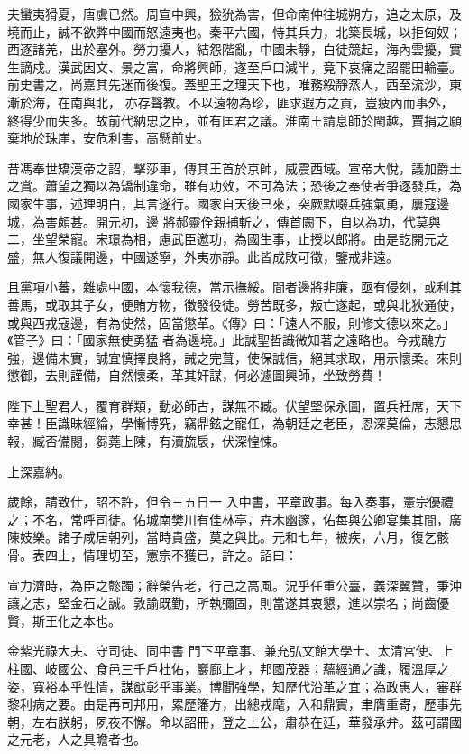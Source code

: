 \begin{pinyinscope}
 夫蠻夷猾夏，唐虞已然。周宣中興，獫狁為害，但命南仲往城朔方，追之太原，及境而止，誠不欲弊中國而怒遠夷也。秦平六國，恃其兵力，北築長城，以拒匈奴；西逐諸羌，出於塞外。勞力擾人，結怨階亂，中國未靜，白徒競起，海內雲擾，實生謫戍。漢武因文、景之富，命將興師，遂至戶口減半，竟下哀痛之詔罷田輪臺。前史書之，尚嘉其先迷而後復。蓋聖王之理天下也，唯務綏靜蒸人，西至流沙，東漸於海，在南與北，
 亦存聲教。不以遠物為珍，匪求遐方之貢，豈疲內而事外，終得少而失多。故前代納忠之臣，並有匡君之議。淮南王請息師於閩越，賈捐之願棄地於珠崖，安危利害，高懸前史。



 昔馮奉世矯漢帝之詔，擊莎車，傳其王首於京師，威震西域。宣帝大悅，議加爵土之賞。蕭望之獨以為矯制違命，雖有功效，不可為法；恐後之奉使者爭逐發兵，為國家生事，述理明白，其言遂行。國家自天後已來，突厥默啜兵強氣勇，屢寇邊城，為害頗甚。開元初，邊
 將郝靈佺親捕斬之，傳首闕下，自以為功，代莫與二，坐望榮寵。宋璟為相，慮武臣邀功，為國生事，止授以郎將。由是訖開元之盛，無人復議開邊，中國遂寧，外夷亦靜。此皆成敗可徵，鑒戒非遠。



 且黨項小蕃，雜處中國，本懷我德，當示撫綏。間者邊將非廉，亟有侵刻，或利其善馬，或取其子女，便賄方物，徵發役徒。勞苦既多，叛亡遂起，或與北狄通使，或與西戎寇邊，有為使然，固當懲革。《傳》曰：「遠人不服，則修文德以來之。」《管子》曰：「國家無使勇猛
 者為邊境。」此誠聖哲識微知著之遠略也。今戎醜方強，邊備未實，誠宜慎擇良將，誡之完葺，使保誠信，絕其求取，用示懷柔。來則懲御，去則謹備，自然懷柔，革其奸謀，何必遽圖興師，坐致勞費！



 陛下上聖君人，覆育群類，動必師古，謀無不臧。伏望堅保永圖，置兵衽席，天下幸甚！臣識昧經綸，學慚博究，竊鼎鉉之寵任，為朝廷之老臣，恩深莫倫，志懇思報，臧否備閱，芻蕘上陳，有瀆旒扆，伏深惶悚。



 上深嘉納。



 歲餘，請致仕，詔不許，但令三五日一
 入中書，平章政事。每入奏事，憲宗優禮之；不名，常呼司徒。佑城南樊川有佳林亭，卉木幽邃，佑每與公卿宴集其間，廣陳妓樂。諸子咸居朝列，當時貴盛，莫之與比。元和七年，被疾，六月，復乞骸骨。表四上，情理切至，憲宗不獲已，許之。詔曰：



 宣力濟時，為臣之懿躅；辭榮告老，行己之高風。況乎任重公臺，義深翼贊，秉沖讓之志，堅金石之誠。敦諭既勤，所執彌固，則當遂其衷懇，進以崇名；尚齒優賢，斯王化之本也。



 金紫光祿大夫、守司徒、同中書
 門下平章事、兼充弘文館大學士、太清宮使、上柱國、岐國公、食邑三千戶杜佑，巖廊上才，邦國茂器；蘊經通之識，履溫厚之姿，寬裕本乎性情，謀猷彰乎事業。博聞強學，知歷代沿革之宜；為政惠人，審群黎利病之要。由是再司邦用，累歷籓方，出總戎麾，入和鼎實，聿膺重寄，歷事先朝，左右朕躬，夙夜不懈。命以詔冊，登之上公，肅恭在廷，華發承弁。茲可謂國之元老，人之具瞻者也。




\end{pinyinscope}
